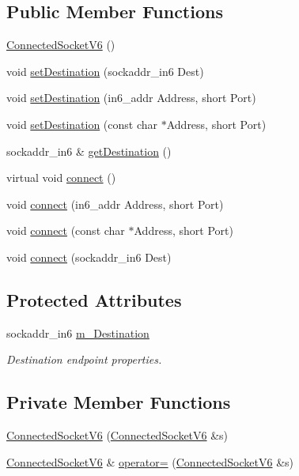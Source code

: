 \subsection*{Public Member Functions}
\begin{DoxyCompactItemize}
\item 
\hyperlink{classConnectedSocketV6_a3669db7a7ad6af9824f56d1565b86889}{Connected\+Socket\+V6} ()
\item 
void \hyperlink{classConnectedSocketV6_ac95a20c1700d3a95b83c253c695f9838}{set\+Destination} (sockaddr\+\_\+in6 Dest)
\item 
void \hyperlink{classConnectedSocketV6_aa4f9dd426ff72420bdd315a9668d2139}{set\+Destination} (in6\+\_\+addr Address, short Port)
\item 
void \hyperlink{classConnectedSocketV6_aefa8952aeb0d63332c4afcd5538b118e}{set\+Destination} (const char $\ast$Address, short Port)
\item 
sockaddr\+\_\+in6 \& \hyperlink{classConnectedSocketV6_a113422dc7ea93e8abfaecbfe4763a260}{get\+Destination} ()
\item 
virtual void \hyperlink{classConnectedSocketV6_ad08bcbb9f35ac5c5693e352d1bbc5460}{connect} ()
\item 
void \hyperlink{classConnectedSocketV6_adfdf319dc49b3ff8cb2507178dfeda3f}{connect} (in6\+\_\+addr Address, short Port)
\item 
void \hyperlink{classConnectedSocketV6_a9b3101138e8dc3df9a70fd3a8d325a8a}{connect} (const char $\ast$Address, short Port)
\item 
void \hyperlink{classConnectedSocketV6_a2f93ef688800a0631eae284661c08368}{connect} (sockaddr\+\_\+in6 Dest)
\end{DoxyCompactItemize}
\subsection*{Protected Attributes}
\begin{DoxyCompactItemize}
\item 
sockaddr\+\_\+in6 \hyperlink{classConnectedSocketV6_ab05802f2cded1638b11541be1e78942c}{m\+\_\+\+Destination}
\begin{DoxyCompactList}\small\item\em Destination endpoint properties. \end{DoxyCompactList}\end{DoxyCompactItemize}
\subsection*{Private Member Functions}
\begin{DoxyCompactItemize}
\item 
\hyperlink{classConnectedSocketV6_ad4936b91c36fca90b65a995145a68692}{Connected\+Socket\+V6} (\hyperlink{classConnectedSocketV6}{Connected\+Socket\+V6} \&s)
\item 
\hyperlink{classConnectedSocketV6}{Connected\+Socket\+V6} \& \hyperlink{classConnectedSocketV6_a75cc4a8c5c0d52167e652eccac12859b}{operator=} (\hyperlink{classConnectedSocketV6}{Connected\+Socket\+V6} \&s)
\end{DoxyCompactItemize}
